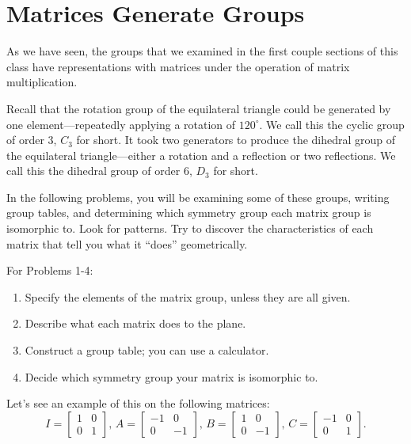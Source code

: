 \documentclass[../gatm.tex]{subfiles}
\begin{document}
\section{Matrices Generate Groups}

As we have seen, the groups that we examined in the first couple sections of this class have representations with matrices under the operation of matrix multiplication.

Recall that the rotation group of the equilateral triangle could be generated by one element---repeatedly applying a rotation of $120^\circ$. We call this the cyclic group of order $3$, $C_3$ for short. It took two generators to produce the dihedral group of the equilateral triangle---either a rotation and a reflection or two reflections. We call this the dihedral group of order $6$, $D_3$ for short.

In the following problems, you will be examining some of these groups, writing group tables, and determining which symmetry group each matrix group is isomorphic to. Look for patterns. Try to discover the characteristics of each matrix that tell you what it ``does'' geometrically.

For Problems 1-4:
\begin{enumerate}[label=(\alph*)]
\item Specify the elements of the matrix group, unless they are all given.
\item Describe what each matrix does to the plane.
\item Construct a group table; you can use a calculator.
\item Decide which symmetry group your matrix is isomorphic to.
\end{enumerate}
\vspace{1cm}

Let's see an example of this on the following matrices:
$$I=\left[\begin{array}{cc} 1 & 0 \\ 0 & 1 \end{array}\right],\, A=\left[\begin{array}{cc} -1 & 0 \\ 0 & -1 \end{array}\right],\,  B=\left[\begin{array}{cc} 1 & 0 \\ 0 & -1 \end{array}\right],\, C=\left[\begin{array}{cc} -1 & 0 \\ 0 & 1 \end{array}\right].$$
\end{document}
